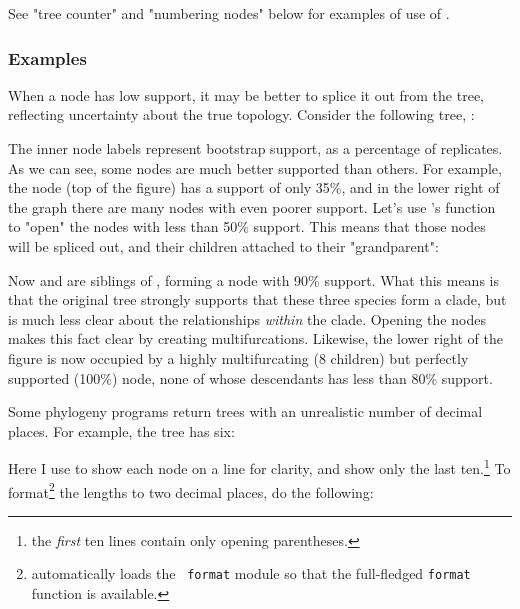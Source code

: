See "tree counter" and "numbering nodes" below for examples of use of
.

\subsubsection{Examples}



When a node has low support, it may be better to splice it out from the tree,
reflecting uncertainty about the true topology. Consider the following tree, 
:

\startalignment[center]
\externalfigure[ed_3_svg]
\stopalignment

The inner node labels represent bootstrap support, as a percentage of
replicates. As we can see, some nodes are much better supported than others.
For example, the  node (top of the figure) has a support
of only 35\%, and in the lower right of the graph there are many nodes with even
poorer support. Let's use \luaed's  function to "open" the nodes with
less than 50\% support. This means that those nodes will be spliced out, and
their children attached to their "grandparent":

\startalignment[center]
\externalfigure[ed_4_svg]
\stopalignment

Now  and  are siblings of
, forming a node with 90\% support. What this means is that the
original tree strongly supports that these three species form a clade, but is
much less clear about the relationships {\em within} the clade. Opening the
nodes makes this fact clear by creating multifurcations. Likewise, the lower
right of the figure is now occupied by a highly multifurcating (8 children) but
perfectly supported (100\%) node, none of whose descendants has less than 80\%
support.



Some phylogeny programs return \nw{} trees with an unrealistic number
of decimal places. For example, the  tree has six:

\page[no]


Here I use \nwindent{} to show each node on a line for clarity, and
show only the last ten.\footnote{the {\em first} ten lines contain only
opening parentheses.} To format\footnote{\sched{} automatically loads the {\tt
format} module so that the full-fledged {\tt format} function is available.}
the lengths to two decimal places, do the following:

